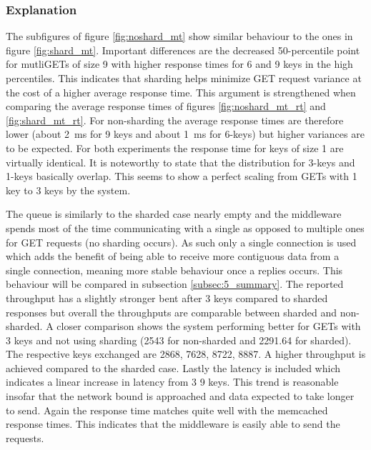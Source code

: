         \subsubsection{Explanation\label{subsubsec:5_nonsharded_summary}}

            The subfigures of figure \ref{fig:noshard_mt} show similar behaviour to the ones in figure
            \ref{fig:shard_mt}. Important differences are the decreased 50-percentile point for mutliGETs of size 9
            with higher response times for 6 and 9 keys in the high percentiles. This indicates that sharding helps
            minimize GET request variance at the cost of a higher average response time. This argument is strengthened
            when comparing the average response times of figures \ref{fig:noshard_mt_rt} and \ref{fig:shard_mt_rt}. For
            non-sharding the average response times are therefore lower (about \SI{2}{\milli\second} for 9 keys and
            about \SI{1}{\milli\second} for 6-keys) but higher variances are to be expected. For both experiments the
            response time for keys of size 1 are virtually identical. It is noteworthy to state that the distribution
            for 3-keys and 1-keys basically overlap. This seems to show a perfect scaling from GETs with 1 key to 3 keys
            by the system.


            The queue is similarly to the sharded case nearly empty and the middleware spends most of the time
            communicating with a single \srv{} as opposed to multiple ones for GET requests (no sharding occurs). As
            such only a single connection is used which adds the benefit of being able to receive more contiguous data
            from a single connection, meaning more stable behaviour once a replies occurs. This behaviour will be
            compared in subsection \ref{subsec:5_summary}.\newline
            The reported throughput has a slightly stronger bent after 3 keys compared to sharded responses but overall
            the throughputs are comparable between sharded and non-sharded. A closer comparison shows the system
            performing better for GETs with 3 keys and not using sharding (2543 for non-sharded and 2291.64 for
            sharded). The respective keys exchanged are 2868, 7628, 8722, 8887. A higher throughput is achieved compared
            to the sharded case. Lastly the latency is included which indicates a linear increase in latency from 3
            \textendash{} 9 keys. This trend is reasonable insofar that the network bound is approached and data
            expected to take longer to send.
            Again the response time matches quite well with the memcached response times. This indicates that the
            middleware is easily able to send the requests.

